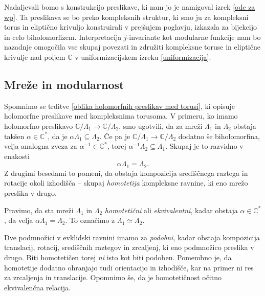 \documentclass[mat1]{fmfdelo}
\numberwithin{equation}{section}
\newcommand{\C}{\mathbb C}
\newcommand{\CM}{\mathbb C ^*}
\newcommand{\inv}{^{-1}}
\newcommand{\htp}{\simeq}
\theoremstyle{definition}
\begin{document}
Nadaljevali bomo s konstrukcijo preslikave, ki nam jo je namigoval izrek \ref{ode za wp}. Ta preslikava se bo preko kompleksnih struktur, ki smo ju za kompleksni torus in eliptično krivuljo konstruirali v prejšnjem poglavju, izkazala za bijekcijo in celo biholomorfizem. 
Interpretacija $j$-invariante kot modularne funkcije nam bo nazadnje omogočila vse skupaj povezati in združiti kompleksne toruse in eliptične krivulje nad poljem $\C$ v uniformizacijskem izreku \ref{uniformizacija}. 

\subsection{Mreže in modularnost}
Spomnimo se trditve \ref{oblika holomorfnih preslikav med torusi}, ki opisuje holomorfne preslikave med kompleksnima torusoma. V primeru, ko imamo holomorfno preslikavo $\C/\Lambda_1 \to \C/\Lambda_2$, smo ugotvili, da za mreži $\Lambda_1$ in $\Lambda_2$ obstaja takšen $\alpha \in \CM$, da je $\alpha\Lambda_1 \subseteq \Lambda_2$. Če pa je $\C/\Lambda_1 \to \C/\Lambda_2$ dodatno še biholomorfina, velja analogna zveza za $\alpha\inv \in \CM$, torej $\alpha\inv\Lambda_2 \subseteq \Lambda_1$. Skupaj je to razvidno v enakosti
\[
    \alpha\Lambda_1 = \Lambda_2. 
\]
Z drugimi besedami to pomeni, da obstaja kompozicija središčnega raztega in rotacije okoli izhodišča -- skupaj \emph{homotetija} kompleksne ravnine, ki eno mrežo preslika v drugo. 

\begin{definicija}
    Pravimo, da sta mreži $\Lambda_1$ in $\Lambda_2$ \emph{homotetični} ali \emph{ekvivalentni}, kadar obstaja $\alpha \in \CM$, da velja $\alpha\Lambda_1 = \Lambda_2$. To označimo z $\Lambda_1 \htp \Lambda_2$.
\end{definicija}

\begin{opomba}
    Dve podmnožici v evklidski ravnini imamo za \emph{podobni}, kadar obstaja kompozicija translacij, rotacij, središčnih raztegov in zrcaljenj, ki eno podmnožico preslika v drugo. Biti homotetičen torej \emph{ni} isto kot biti podoben. Pomembno je, da homotetije dodatno ohranjajo tudi orientacijo in izhodišče, kar na primer ni res za zrcaljenja in translacije. Opomnimo še, da je homotetičnost očitno ekvivalenčna relacija.
\end{opomba}
\end{document}
